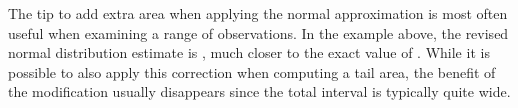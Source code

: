 The tip to add extra area when applying the normal
approximation is most often useful when examining
a range of observations.
In the example above, the revised normal distribution
estimate is \smokeABCNormalFixed{}, much closer to the
exact value of \smokeABCBinom{}.
While it is possible to also apply this correction when
computing a tail area, the benefit of the modification
usually disappears since the total interval is typically
quite wide.



{}




